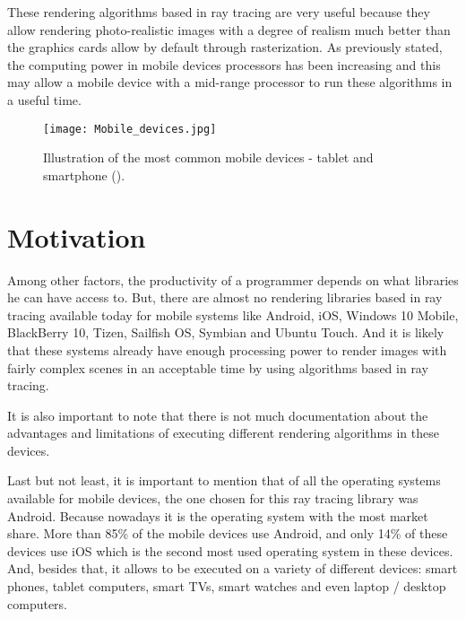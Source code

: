 \par
These rendering algorithms based in ray tracing are very useful because they allow rendering photo-realistic images with a degree of realism much better than the graphics cards allow by default through rasterization.
As previously stated, the computing power in mobile devices processors has been increasing and this may allow a mobile device with a mid-range processor to run these algorithms in a useful time.

\begin{figure}[H]
\centering
\caption{Illustration of the most common mobile devices - tablet and smartphone (\cite{JournalDuNet}).}
\label{Illustration of the most common mobile devices - tablet and smartphone}
\texttt{[image: Mobile\_devices.jpg]}
\end{figure}

\section{Motivation}

\par
Among other factors, the productivity of a programmer depends on what libraries he can have access to.
But, there are almost no rendering libraries based in ray tracing available today for mobile systems like Android, iOS, Windows 10 Mobile, BlackBerry 10, Tizen, Sailfish OS, Symbian and Ubuntu Touch.
And it is likely that these systems already have enough processing power to render images with fairly complex scenes in an acceptable time by using algorithms based in ray tracing.

\par
It is also important to note that there is not much documentation about the advantages and limitations of executing different rendering algorithms in these devices.

\par
Last but not least, it is important to mention that of all the operating systems available for mobile devices, the one chosen for this ray tracing library was Android.
Because nowadays it is the operating system with the most market share.
More than 85\% of the mobile devices use Android, and only 14\% of these devices use iOS which is the second most used operating system in these devices.
And, besides that, it allows to be executed on a variety of different devices: smart phones, tablet computers, smart TVs, smart watches and even laptop / desktop computers.

